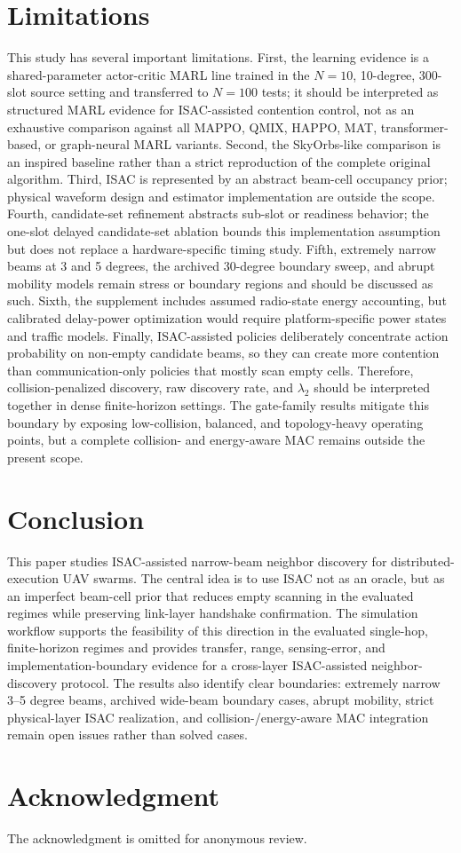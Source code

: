 \documentclass[journal]{IEEEtran}
\begin{document}
\section{Limitations}
This study has several important limitations.
First, the learning evidence is a shared-parameter actor-critic MARL line trained in the $N=10$, 10-degree, 300-slot source setting and transferred to $N=100$ tests; it should be interpreted as structured MARL evidence for ISAC-assisted contention control, not as an exhaustive comparison against all MAPPO, QMIX, HAPPO, MAT, transformer-based, or graph-neural MARL variants.
Second, the SkyOrbs-like comparison is an inspired baseline rather than a strict reproduction of the complete original algorithm.
Third, ISAC is represented by an abstract beam-cell occupancy prior; physical waveform design and estimator implementation are outside the scope.
Fourth, candidate-set refinement abstracts sub-slot or readiness behavior; the one-slot delayed candidate-set ablation bounds this implementation assumption but does not replace a hardware-specific timing study.
Fifth, extremely narrow beams at 3 and 5 degrees, the archived 30-degree boundary sweep, and abrupt mobility models remain stress or boundary regions and should be discussed as such.
Sixth, the supplement includes assumed radio-state energy accounting, but calibrated delay-power optimization would require platform-specific power states and traffic models.
Finally, ISAC-assisted policies deliberately concentrate action probability on non-empty candidate beams, so they can create more contention than communication-only policies that mostly scan empty cells.
Therefore, collision-penalized discovery, raw discovery rate, and $\lambda_2$ should be interpreted together in dense finite-horizon settings.
The gate-family results mitigate this boundary by exposing low-collision, balanced, and topology-heavy operating points, but a complete collision- and energy-aware MAC remains outside the present scope.

\section{Conclusion}
This paper studies ISAC-assisted narrow-beam neighbor discovery for distributed-execution UAV swarms.
The central idea is to use ISAC not as an oracle, but as an imperfect beam-cell prior that reduces empty scanning in the evaluated regimes while preserving link-layer handshake confirmation.
The simulation workflow supports the feasibility of this direction in the evaluated single-hop, finite-horizon regimes and provides transfer, range, sensing-error, and implementation-boundary evidence for a cross-layer ISAC-assisted neighbor-discovery protocol.
The results also identify clear boundaries: extremely narrow 3--5 degree beams, archived wide-beam boundary cases, abrupt mobility, strict physical-layer ISAC realization, and collision-/energy-aware MAC integration remain open issues rather than solved cases.

\section*{Acknowledgment}
The acknowledgment is omitted for anonymous review.



\end{document}
